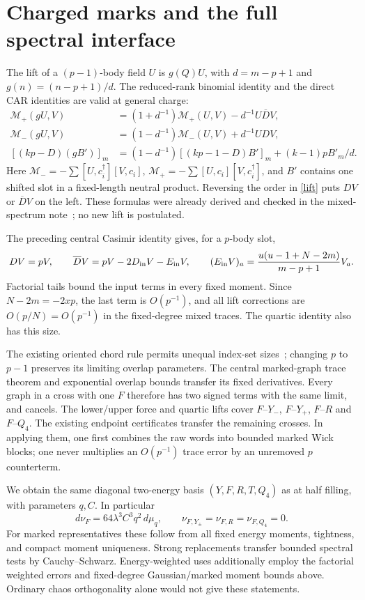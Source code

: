 \documentclass[11pt,a4paper]{article}
\newcommand{\Db}{\overline D}
\begin{document}
\newpage
\section{Charged marks and the full spectral interface}
The lift of a $(p-1)$-body field $U$ is $g(Q)U$, with
$d=m-p+1$ and $g(n)=(n-p+1)/d$. The reduced-rank binomial
identity and the direct CAR identities are valid at general charge:
\begin{align}
 \mathcal M_+(gU,V)&=(1+d^{-1})\mathcal M_+(U,V)-d^{-1}U\Db V,\\
 \mathcal M_-(gU,V)&=(1-d^{-1})\mathcal M_-(U,V)+d^{-1}UDV,\label{lift}\\
 [(kp-D)(gB')]_m&=(1-d^{-1})[(kp-1-D)B']_m
                       +(k-1)pB'_m/d.
\end{align}
Here $\mathcal M_-=-\sum[U,c_i^\dagger][V,c_i]$,
$\mathcal M_+=-\sum[U,c_i][V,c_i^\dagger]$, and $B'$ contains
one shifted slot in a fixed-length neutral product.
Reversing the order in \eqref{lift} puts $DV$ or $\Db V$ on
the left. These formulas were already derived and checked in
the mixed-spectrum note~\cite{mixed}; no new lift is postulated.

The preceding central Casimir identity gives, for a $p$-body slot,
\begin{equation}
 DV=pV,\qquad \Db V=pV-2D_{\rm in}V-E_{\rm in}V,\qquad
 (E_{\rm in}V)_a=\frac{u(u-1+N-2m)}{m-p+1}V_a.
\end{equation}
Factorial tails bound the input terms in every fixed moment.
Since $N-2m=-2xp$, the last term is $O(p^{-1})$,
and all lift corrections are $O(p/N)=O(p^{-1})$ in the
fixed-degree mixed traces. The quartic identity also has this size.

The existing oriented chord rule permits unequal index-set
sizes~\cite{BNR}; changing $p$ to $p-1$ preserves its limiting
overlap parameters. The central marked-graph trace theorem
and exponential overlap bounds transfer its fixed derivatives.
Every graph in a cross with one $F$ therefore has two signed
terms with the same limit, and cancels. The lower/upper force
and quartic lifts cover $F$--$Y_-$, $F$--$Y_+$, $F$--$R$ and
$F$--$Q_4$. The existing endpoint certificates transfer the
remaining crosses. In applying them, one first combines the raw
words into bounded marked Wick blocks; one never multiplies
an $O(p^{-1})$ trace error by an unremoved $p$ counterterm.

We obtain the same diagonal two-energy basis $(Y,F,R,T,Q_4)$
as at half filling, with parameters $q,C$. In particular
\begin{equation}
 d\nu_F=64\lambda^3C^3q^2\,d\mu_q,\qquad
 \nu_{F,Y_\pm}=\nu_{F,R}=\nu_{F,Q_4}=0.
\end{equation}
For marked representatives these follow from all fixed energy
moments, tightness, and compact moment uniqueness. Strong
replacements transfer bounded spectral tests by Cauchy--Schwarz.
Energy-weighted uses additionally employ the factorial weighted
errors and fixed-degree Gaussian/marked moment bounds above.
Ordinary chaos orthogonality alone would not give these statements.
\end{document}
